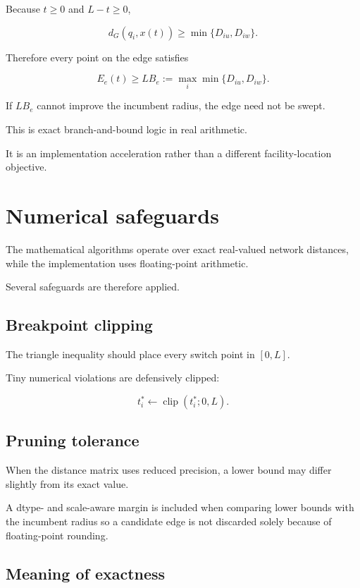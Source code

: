 \documentclass[11pt]{article}
\newcommand{\clip}{\operatorname{clip}}
\begin{document}
Because \(t\ge0\) and \(L-t\ge0\),

\[
d_G(q_i,x(t))
\ge
\min\{D_{iu},D_{iw}\}.
\]

Therefore every point on the edge satisfies

\begin{equation}
E_e(t)
\ge
LB_e
:=
\max_i\min\{D_{iu},D_{iw}\}.
\label{eq:lowerbound}
\end{equation}

If \(LB_e\) cannot improve the incumbent radius, the edge need not be swept.

This is exact branch-and-bound logic in real arithmetic.

It is an implementation acceleration rather than a different facility-location
objective.

\section{Numerical safeguards}

The mathematical algorithms operate over exact real-valued network distances,
while the implementation uses floating-point arithmetic.

Several safeguards are therefore applied.

\subsection{Breakpoint clipping}

The triangle inequality should place every switch point in \([0,L]\).

Tiny numerical violations are defensively clipped:

\[
t_i^*
\leftarrow
\clip(t_i^*;0,L).
\]

\subsection{Pruning tolerance}

When the distance matrix uses reduced precision, a lower bound may differ
slightly from its exact value.

A dtype- and scale-aware margin is included when comparing lower bounds with the
incumbent radius so a candidate edge is not discarded solely because of
floating-point rounding.

\subsection{Meaning of exactness}
\end{document}
